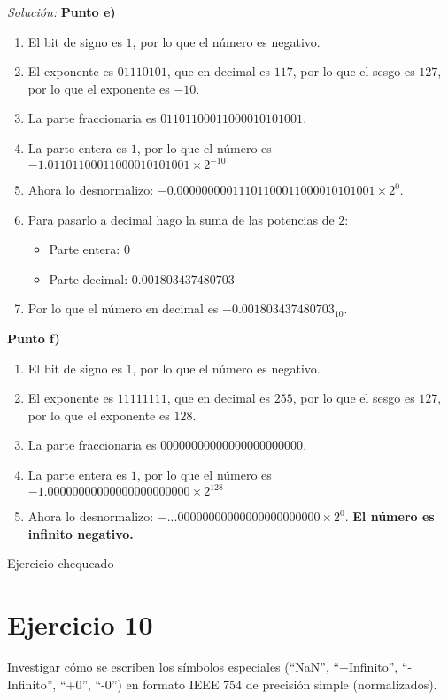 \documentclass{article}
\newenvironment{solution}
    {\textit{Solución:}}
    {}
\begin{document}
\begin{solution}
\textbf{Punto e)}
\begin{enumerate}
    \item El bit de signo es $1$, por lo que el número es negativo.
    \item El exponente es $01110101$, que en decimal es $117$, por lo que el sesgo es $127$, por lo que el exponente es $-10$.
    \item La parte fraccionaria es $01101100011000010101001$.
    \item La parte entera es $1$, por lo que el número es $-1.01101100011000010101001 \times 2^{-10}$
    \item Ahora lo desnormalizo: $-0.00000000011101100011000010101001 \times 2^{0}$.
    \item Para pasarlo a decimal hago la suma de las potencias de $2$:
    \begin{itemize}
        \item Parte entera: $0$ 
        \item Parte decimal: $0.001803437480703$
    \end{itemize}
    \item Por lo que el número en decimal es $-0.001803437480703_{10}$.
\end{enumerate}

\newpage
\textbf{Punto f)}
\begin{enumerate}
    \item El bit de signo es $1$, por lo que el número es negativo.
    \item El exponente es $11111111$, que en decimal es $255$, por lo que el sesgo es $127$, por lo que el exponente es $128$.
    \item La parte fraccionaria es $00000000000000000000000$.
    \item La parte entera es $1$, por lo que el número es $-1.00000000000000000000000 \times 2^{128}$
    \item Ahora lo desnormalizo: $-...00000000000000000000000 \times 2^{0}$.
    \textbf{El número es infinito negativo.}
\end{enumerate}
\end{solution}

{\color{green} Ejercicio chequeado}

\section*{Ejercicio 10}
Investigar cómo se escriben los símbolos especiales (“NaN”, “+Infinito”, “-Infinito”, “+0”, “-0”)
en formato IEEE 754 de precisión simple (normalizados).
\end{document}
